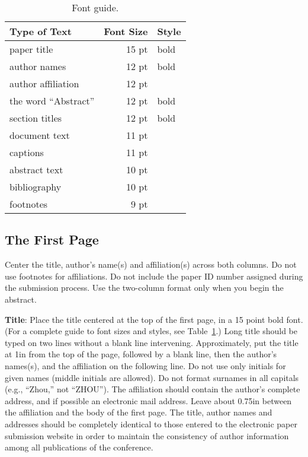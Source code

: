 \documentclass[11pt]{article}
\begin{document}
\begin{table}[h]
\begin{center}
\begin{tabular}{|l|rl|}
\hline \bf Type of Text & \bf Font Size & \bf Style \\ \hline
paper title & 15 pt & bold \\
author names & 12 pt & bold \\
author affiliation & 12 pt & \\
the word ``Abstract'' & 12 pt & bold \\
section titles & 12 pt & bold \\
document text & 11 pt  &\\
captions & 11 pt & \\
abstract text & 10 pt & \\
bibliography & 10 pt & \\
footnotes & 9 pt & \\
\hline
\end{tabular}
\end{center}
\caption{\label{font-table} Font guide. }
\end{table}

\subsection{The First Page}
\label{ssec:first}

Center the title, author's name(s) and affiliation(s) across both
columns. Do not use footnotes for affiliations.  Do not include the
paper ID number assigned during the submission process.
Use the two-column format only when you begin the abstract.

{\bf Title}: Place the title centered at the top of the first page, in
a 15 point bold font.  (For a complete guide to font sizes and styles, see Table~\ref{font-table}.)
Long title should be typed on two lines without
a blank line intervening. Approximately, put the title at 1in from the
top of the page, followed by a blank line, then the author's names(s),
and the affiliation on the following line.  Do not use only initials
for given names (middle initials are allowed). Do not format surnames
in all capitals (e.g., ``Zhou,'' not ``ZHOU'').  The affiliation should
contain the author's complete address, and if possible an electronic
mail address. Leave about 0.75in between the affiliation and the body
of the first page. The title, author names and addresses should be completely identical to those entered to the electronic paper submission website in order to maintain the consistency of author information among all publications of the conference.
\end{document}

